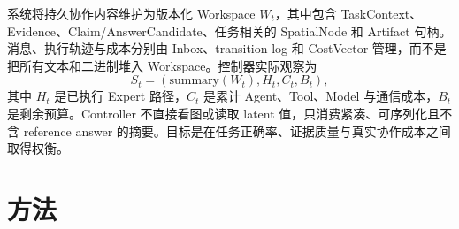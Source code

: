 \documentclass[10pt,a4paper,twocolumn]{ctexart}
\begin{document}
系统将持久协作内容维护为版本化 Workspace $W_t$，其中包含 TaskContext、Evidence、Claim/AnswerCandidate、任务相关的 SpatialNode 和 Artifact 句柄。消息、执行轨迹与成本分别由 Inbox、transition log 和 CostVector 管理，而不是把所有文本和二进制堆入 Workspace。控制器实际观察为
\begin{equation}
S_t=(\mathrm{summary}(W_t),H_t,C_t,B_t),
\end{equation}
其中 $H_t$ 是已执行 Expert 路径，$C_t$ 是累计 Agent、Tool、Model 与通信成本，$B_t$ 是剩余预算。Controller 不直接看图或读取 latent 值，只消费紧凑、可序列化且不含 reference answer 的摘要。目标是在任务正确率、证据质量与真实协作成本之间取得权衡。

\section{方法}
\end{document}
